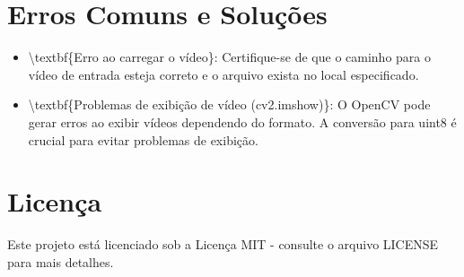 \documentclass{article}%
\begin{document}
%
\section{Erros Comuns e Soluções}%
\label{sec:ErrosComunseSolues}%
\begin{itemize}%
\item%
\textbackslash{}textbf\{Erro ao carregar o vídeo\}: Certifique{-}se de que o caminho para o vídeo de entrada esteja correto e o arquivo exista no local especificado.%
\item%
\textbackslash{}textbf\{Problemas de exibição de vídeo (cv2.imshow)\}: O OpenCV pode gerar erros ao exibir vídeos dependendo do formato. A conversão para uint8 é crucial para evitar problemas de exibição.%
\end{itemize}

%
\section{Licença}%
\label{sec:Licena}%
Este projeto está licenciado sob a Licença MIT {-} consulte o arquivo LICENSE para mais detalhes.

%
\end{document}
